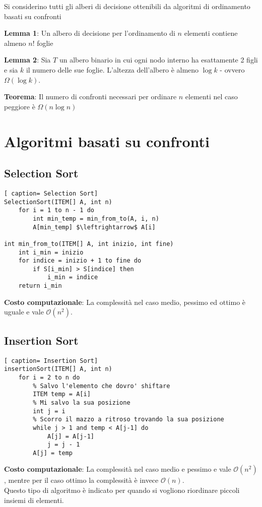 \documentclass[../cheatSheetAlgoritmi.tex]{subfiles}
\begin{document}
Si considerino tutti gli alberi di decisione ottenibili da algoritmi di ordinamento basati su confronti

\bigskip
\textbf{Lemma 1}: Un albero di decisione per l'ordinamento di $n$ elementi contiene almeno $n!$ foglie

\bigskip
\textbf{Lemma 2}: Sia $T$ un albero binario in cui ogni nodo interno ha esattamente 2 figli e sia $k$ il numero delle sue foglie. L'altezza dell'albero è almeno $\log k$ - ovvero $\Omega(\log k)$.

\bigskip
\textbf{Teorema}: Il numero di confronti necessari per ordinare $n$ elementi nel caso
peggiore è $\Omega(n \log n)$

\section{Algoritmi basati su confronti}
\subsection{Selection Sort}
\begin{lstlisting}[ caption= Selection Sort]
SelectionSort(ITEM[] A, int n)
	for i = 1 to n - 1 do
		int min_temp = min_from_to(A, i, n)
		A[min_temp] $\leftrightarrow$ A[i]

int min_from_to(ITEM[] A, int inizio, int fine)
	int i_min = inizio
  	for indice = inizio + 1 to fine do
		if S[i_min] > S[indice] then
			i_min = indice
	return i_min
\end{lstlisting}
\textbf{Costo computazionale}: La complessità nel caso medio, pessimo ed ottimo è uguale e vale $\mathcal{O}(n^{2})$.
\subsection{Insertion Sort}
\begin{lstlisting}[ caption= Insertion Sort]
insertionSort(ITEM[] A, int n)
	for i = 2 to n do
		% Salvo l'elemento che dovro' shiftare
		ITEM temp = A[i]
		% Mi salvo la sua posizione
		int j = i
		% Scorro il mazzo a ritroso trovando la sua posizione
		while j > 1 and temp < A[j-1] do
			A[j] = A[j-1]
			j = j - 1
		A[j] = temp
\end{lstlisting}
\textbf{Costo computazionale}: La complessità nel caso medio e pessimo  e vale $\mathcal{O}(n^{2})$, mentre per il caso ottimo la complessità è invece $\mathcal{O}(n)$. \\
Questo tipo di algoritmo è indicato per quando si vogliono riordinare piccoli insiemi di elementi.
\newpage
\end{document}
